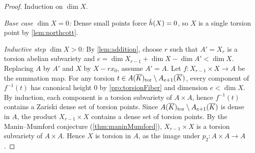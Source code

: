 \begin{proof}
  Induction on \(\dim X\).

  \emph{Base case \(\dim X = 0\):} Dense small points force \(\hat{h}(X)=0\), so \(X\) is a
  single torsion point by \cref{lem:northcott}.

  \emph{Inductive step \(\dim X > 0\):}
  By \cref{lem:addition}, choose \(r\) such that \(A' = X_r\) is a torsion abelian
  subvariety and \(e = \dim X_{r-1} + \dim X - \dim A' < \dim X\).
  Replacing \(A\) by \(A'\) and \(X\) by \(X - rx_0\), assume \(A' = A\).
  Let \(f\colon X_{r-1}\times X \to A\) be the summation map.
  For any torsion \(t \in A(\overline{K})_{\rm tor} \setminus A_{e+1}(\overline{K})\), every component of
  \(f^{-1}(t)\) has canonical height \(0\) by \cref{pro:torsionFiber} and dimension \(e < \dim X\).
  By induction, each component is a torsion subvariety of \(A \times A\), hence
  \(f^{-1}(t)\) contains a Zariski dense set of torsion points.
  Since \(A(\overline{K})_{\rm tor} \setminus A_{e+1}(\overline{K})\) is dense in \(A\), the product
  \(X_{r-1}\times X\) contains a dense set of torsion points.
  By the Manin--Mumford conjecture (\cref{thm:maninMumford}),
  \(X_{r-1}\times X\) is a torsion subvariety of \(A\times A\).
  Hence \(X\) is torsion in \(A\), as the image under \(p_2\colon A\times A\to A\).
\end{proof}
